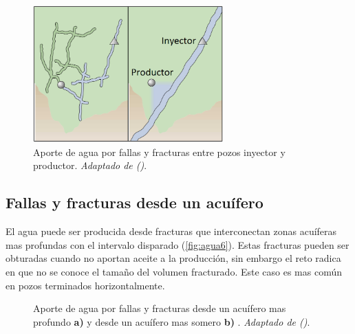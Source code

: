 \begin{figure}\centering
    \includegraphics[width=0.65\textwidth]{Graphics/agua5.png}
    \caption[Fracturas de inyector a productor]{Aporte de agua por fallas y fracturas entre pozos inyector y productor. \emph{Adaptado de (\cite{Bailey2000})}.}
    \label{fig:agua5}
\end{figure}

\subsection{Fallas y fracturas desde un acuífero}
El agua puede ser producida desde fracturas que interconectan zonas acuíferas mas profundas con el intervalo disparado (\autoref{fig:agua6}). Estas fracturas pueden ser obturadas cuando no aportan aceite a la producción, sin embargo el reto radica en que no se conoce el tamaño del volumen fracturado. Este caso es mas común en pozos terminados horizontalmente.

\begin{figure}\centering
   \quad
  \caption[Fallas y fracturas desde un acuifero]{Aporte de agua por fallas y fracturas desde un acuífero mas profundo \textbf{a)} y desde un acuífero mas somero \textbf{b)} . \emph{Adaptado de (\cite{Bailey2000})}.}
  \label{fig:agua6}
\end{figure}

